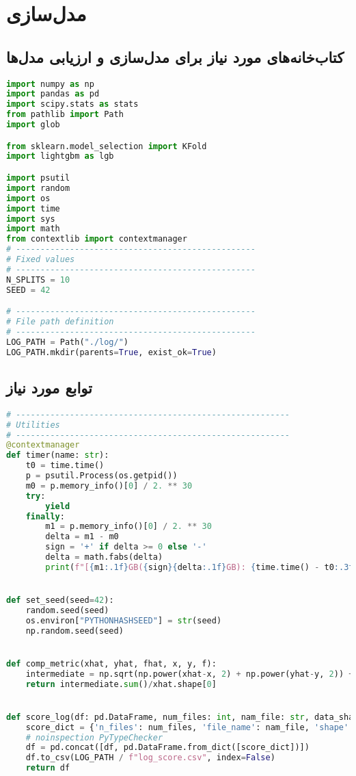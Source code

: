 \documentclass{article}
\begin{document}
\section{مدل‌سازی}
\subsection*{کتاب‌خانه‌های مورد نیاز برای مدل‌سازی و ارزیابی مدل‌ها}
\begin{latin}
\begin{lstlisting}[language=Python]
import numpy as np
import pandas as pd
import scipy.stats as stats
from pathlib import Path
import glob

from sklearn.model_selection import KFold
import lightgbm as lgb

import psutil
import random
import os
import time
import sys
import math
from contextlib import contextmanager
# -------------------------------------------------
# Fixed values
# -------------------------------------------------
N_SPLITS = 10
SEED = 42

# -------------------------------------------------
# File path definition
# -------------------------------------------------
LOG_PATH = Path("./log/")
LOG_PATH.mkdir(parents=True, exist_ok=True)
\end{lstlisting}
\end{latin}
\subsection*{توابع مورد نیاز}
\begin{latin}
\begin{lstlisting}[language=Python]
# --------------------------------------------------------
# Utilities
# --------------------------------------------------------
@contextmanager
def timer(name: str):
	t0 = time.time()
	p = psutil.Process(os.getpid())
	m0 = p.memory_info()[0] / 2. ** 30
	try:
		yield
	finally:
		m1 = p.memory_info()[0] / 2. ** 30
		delta = m1 - m0
		sign = '+' if delta >= 0 else '-'
		delta = math.fabs(delta)
		print(f"[{m1:.1f}GB({sign}{delta:.1f}GB): {time.time() - t0:.3f}sec] {name}", file=sys.stderr)


def set_seed(seed=42):
	random.seed(seed)
	os.environ["PYTHONHASHSEED"] = str(seed)
	np.random.seed(seed)


def comp_metric(xhat, yhat, fhat, x, y, f):
	intermediate = np.sqrt(np.power(xhat-x, 2) + np.power(yhat-y, 2)) + 15 * np.abs(fhat-f)
	return intermediate.sum()/xhat.shape[0]


def score_log(df: pd.DataFrame, num_files: int, nam_file: str, data_shape: tuple, n_fold: int, seed: int, mpe: float):
	score_dict = {'n_files': num_files, 'file_name': nam_file, 'shape': data_shape, 'fold': n_fold, 'seed': seed, 'score': mpe}
	# noinspection PyTypeChecker
	df = pd.concat([df, pd.DataFrame.from_dict([score_dict])])
	df.to_csv(LOG_PATH / f"log_score.csv", index=False)
	return df
\end{lstlisting}
\end{latin}
\end{document}
